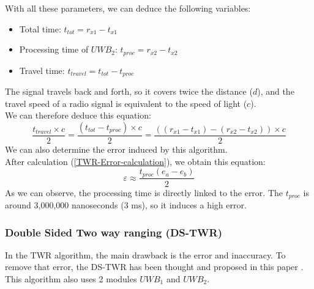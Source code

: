 With all these parameters, we can deduce the following variables:
\begin{itemize}
    \item Total time: $t_{tot} = r_{x1} - t_{x1}$
    \item Processing time of $UWB_2$: $t_{proc} = r_{x2} - t_{x2}$
    \item Travel time: $t_{travel} = t_{tot} - t_{proc}$
\end{itemize}
The signal travels back and forth, so it covers twice the distance ($d$), and the travel speed of a radio signal is equivalent to the speed of light ($c$). \\ 
We can therefore deduce this equation: 
\begin{equation} \label{TWR_eq}
\boxed{\frac{t_{travel}\times c}{2}=\frac{(t_{tot} - t_{proc}) \times c}{2}= \frac{((r_{x1} - t_{x1}) - (r_{x2} - t_{x2})) \times c}{2}}
\end{equation}
We can also determine the error induced by this algorithm.\\
After calculation (\ref{TWR-Error-calculation}), we obtain this equation: 
\begin{equation}
\varepsilon \approx \frac{t_ {proc}(e_a - e_b)}{2}
\end{equation}
As we can observe, the processing time is directly linked to the error. The $t_{proc}$ is around 3,000,000 nanoseconds (3 ms), so it induces a high error.

\subsubsection{Double Sided Two way ranging (DS-TWR)}
\label{DS-TWR}
In the TWR algorithm, the main drawback is the error and inaccuracy.
To remove that error, the DS-TWR has been thought and proposed in this paper \cite{gezici_localization_nodate}. This algorithm also uses 2 modules $UWB_1$ and $UWB_2$.

